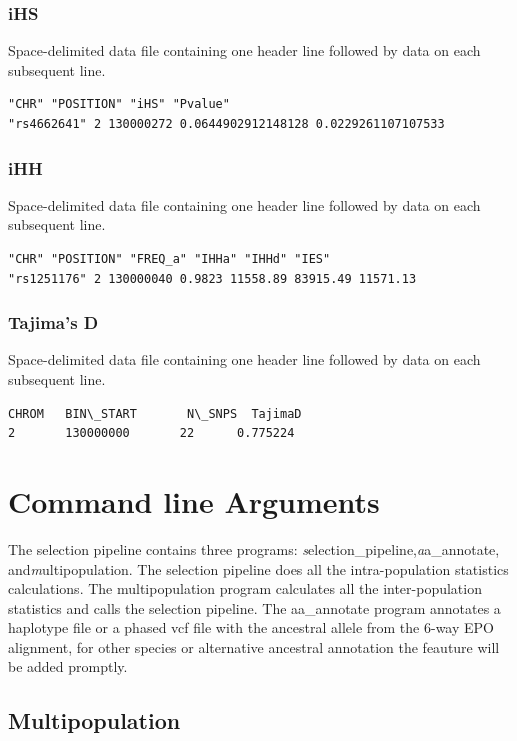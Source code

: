 \documentclass[a4paper,10pt]{article}
\begin{document}
\subsubsection{iHS}
Space-delimited data file containing one header line followed by data on each subsequent line.\\
\begin{verbatim}
"CHR" "POSITION" "iHS" "Pvalue"
"rs4662641" 2 130000272 0.0644902912148128 0.0229261107107533
\end{verbatim}
\subsubsection{iHH}
Space-delimited data file containing one header line followed by data on each subsequent line.\\
\begin{verbatim}
"CHR" "POSITION" "FREQ_a" "IHHa" "IHHd" "IES"
"rs1251176" 2 130000040 0.9823 11558.89 83915.49 11571.13
\end{verbatim}
\subsubsection{Tajima's D}
Space-delimited data file containing one header line followed by data on each subsequent line.\\
\begin{verbatim}
CHROM   BIN\_START       N\_SNPS  TajimaD
2       130000000       22      0.775224
\end{verbatim}

\section{Command line Arguments}
The selection pipeline contains three programs: \emph selection\_pipeline,\emph aa\_annotate, and\emph multipopulation. The selection pipeline does all the intra-population statistics calculations. The multipopulation program calculates all the inter-population statistics and calls the selection pipeline. The aa\_annotate program annotates a haplotype file or a phased vcf file with the ancestral allele from the 6-way EPO alignment, for other species or alternative ancestral annotation the feauture will be added promptly.
\subsection{Multipopulation}
\end{document}
